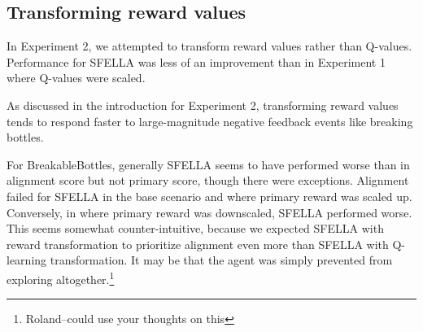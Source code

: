 



\subsection{Transforming reward values}

In Experiment 2, we attempted to transform reward values rather than Q-values. Performance for SFELLA was less of an improvement than in Experiment 1 where Q-values were scaled.

As discussed in the introduction for Experiment 2, transforming reward values tends to respond faster to large-magnitude negative feedback events like breaking bottles. 

For BreakableBottles, generally SFELLA seems to have performed worse than \tloA{} in alignment score but not primary score, though there were exceptions. Alignment failed for SFELLA in the base scenario and where primary reward was scaled up. Conversely, in where primary reward was downscaled, SFELLA performed worse. This seems somewhat counter-intuitive, because we expected SFELLA with reward transformation to prioritize alignment even more than SFELLA with Q-learning transformation. It may be that the agent was simply prevented from exploring altogether.\footnote{Roland--could use your thoughts on this}


